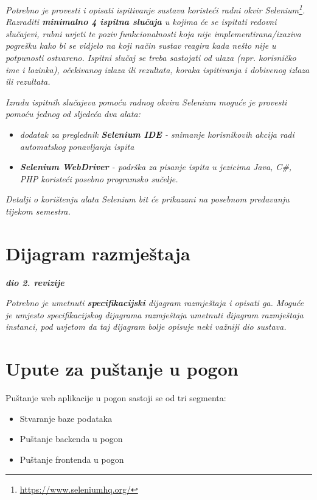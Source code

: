 			 \textit{Potrebno je provesti i opisati ispitivanje sustava koristeći radni okvir Selenium\footnote{\url{https://www.seleniumhq.org/}}. Razraditi \textbf{minimalno 4 ispitna slučaja} u kojima će se ispitati redovni slučajevi, rubni uvjeti te poziv funkcionalnosti koja nije implementirana/izaziva pogrešku kako bi se vidjelo na koji način sustav reagira kada nešto nije u potpunosti ostvareno. Ispitni slučaj se treba sastojati od ulaza (npr. korisničko ime i lozinka), očekivanog izlaza ili rezultata, koraka ispitivanja i dobivenog izlaza ili rezultata.\\ }
			 
			 \textit{Izradu ispitnih slučajeva pomoću radnog okvira Selenium moguće je provesti pomoću jednog od sljedeća dva alata:}
			 \begin{itemize}
			 	\item \textit{dodatak za preglednik \textbf{Selenium IDE} - snimanje korisnikovih akcija radi automatskog ponavljanja ispita	}
			 	\item \textit{\textbf{Selenium WebDriver} - podrška za pisanje ispita u jezicima Java, C\#, PHP koristeći posebno programsko sučelje.}
			 \end{itemize}
		 	\textit{Detalji o korištenju alata Selenium bit će prikazani na posebnom predavanju tijekom semestra.}
			
			\eject 
		
		
		\section{Dijagram razmještaja}
			
			\textbf{\textit{dio 2. revizije}}
			
			 \textit{Potrebno je umetnuti \textbf{specifikacijski} dijagram razmještaja i opisati ga. Moguće je umjesto specifikacijskog dijagrama razmještaja umetnuti dijagram razmještaja instanci, pod uvjetom da taj dijagram bolje opisuje neki važniji dio sustava.}
			
			\eject 
		
		\section{Upute za puštanje u pogon}
		
			\indent Puštanje web aplikacije u pogon sastoji se od tri segmenta:
			\begin{itemize}
				\item Stvaranje baze podataka
				\item Puštanje backenda u pogon
				\item Puštanje frontenda u pogon
			\end{itemize}
		
